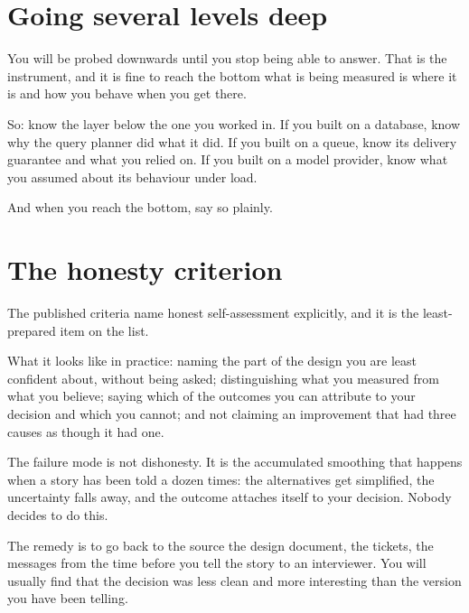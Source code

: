 \section{Going several levels deep}

You will be probed downwards until you stop being able to answer. That is the
instrument, and it is fine to reach the bottom \dash{} what is being measured is
where it is and how you behave when you get there.

So: know the layer below the one you worked in. If you built on a database,
know why the query planner did what it did. If you built on a queue, know its
delivery guarantee and what you relied on. If you built on a model provider,
know what you assumed about its behaviour under load.

And when you reach the bottom, say so plainly. 

\section{The honesty criterion}

The published criteria name honest self-assessment explicitly, and it is the
least-prepared item on the list.

What it looks like in practice: naming the part of the design you are least
confident about, without being asked; distinguishing what you measured from
what you believe; saying which of the outcomes you can attribute to your
decision and which you cannot; and not claiming an improvement that had three
causes as though it had one.

\begin{kittrap}
The failure mode is not dishonesty. It is the accumulated smoothing that
happens when a story has been told a dozen times: the alternatives get
simplified, the uncertainty falls away, and the outcome attaches itself to your
decision. Nobody decides to do this.

The remedy is to go back to the source \dash{} the design document, the
tickets, the messages from the time \dash{} before you tell the story to an
interviewer. You will usually find that the decision was less clean and more
interesting than the version you have been telling.
\end{kittrap}

